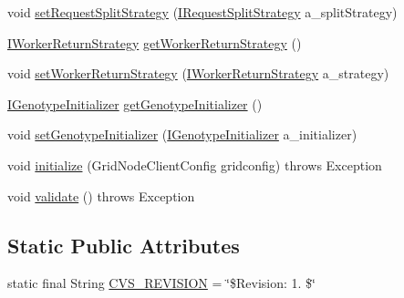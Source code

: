 \begin{DoxyCompactItemize}
\item 
void \hyperlink{interfaceorg_1_1jgap_1_1distr_1_1grid_1_1_i_grid_configuration_a7a83a85853173d181d3d9c723258d621}{set\-Request\-Split\-Strategy} (\hyperlink{interfaceorg_1_1jgap_1_1distr_1_1grid_1_1_i_request_split_strategy}{I\-Request\-Split\-Strategy} a\-\_\-split\-Strategy)
\item 
\hyperlink{interfaceorg_1_1jgap_1_1distr_1_1grid_1_1_i_worker_return_strategy}{I\-Worker\-Return\-Strategy} \hyperlink{interfaceorg_1_1jgap_1_1distr_1_1grid_1_1_i_grid_configuration_abc9501a927b416ffb371985360c7e5e5}{get\-Worker\-Return\-Strategy} ()
\item 
void \hyperlink{interfaceorg_1_1jgap_1_1distr_1_1grid_1_1_i_grid_configuration_a72a91b11601c54ff95524ffadab2219b}{set\-Worker\-Return\-Strategy} (\hyperlink{interfaceorg_1_1jgap_1_1distr_1_1grid_1_1_i_worker_return_strategy}{I\-Worker\-Return\-Strategy} a\-\_\-strategy)
\item 
\hyperlink{interfaceorg_1_1jgap_1_1distr_1_1grid_1_1_i_genotype_initializer}{I\-Genotype\-Initializer} \hyperlink{interfaceorg_1_1jgap_1_1distr_1_1grid_1_1_i_grid_configuration_ab1e5adc26d13de61b95c1b7f365b3b4e}{get\-Genotype\-Initializer} ()
\item 
void \hyperlink{interfaceorg_1_1jgap_1_1distr_1_1grid_1_1_i_grid_configuration_a36afefa2cde7cf3600fd69733df106b9}{set\-Genotype\-Initializer} (\hyperlink{interfaceorg_1_1jgap_1_1distr_1_1grid_1_1_i_genotype_initializer}{I\-Genotype\-Initializer} a\-\_\-initializer)
\item 
void \hyperlink{interfaceorg_1_1jgap_1_1distr_1_1grid_1_1_i_grid_configuration_a266594d162e58fb1494155713b83ee95}{initialize} (Grid\-Node\-Client\-Config gridconfig)  throws Exception
\item 
void \hyperlink{interfaceorg_1_1jgap_1_1distr_1_1grid_1_1_i_grid_configuration_a6f2088e7f1710e511fa3f26f8038a602}{validate} ()  throws Exception
\end{DoxyCompactItemize}
\subsection*{Static Public Attributes}
\begin{DoxyCompactItemize}
\item 
static final String \hyperlink{interfaceorg_1_1jgap_1_1distr_1_1grid_1_1_i_grid_configuration_ad8cc715c7081403fccd494b9d0683f32}{C\-V\-S\-\_\-\-R\-E\-V\-I\-S\-I\-O\-N} = \char`\"{}\$Revision\-: 1. \$\char`\"{}
\end{DoxyCompactItemize}


